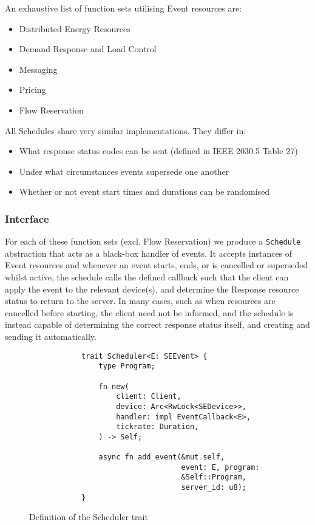 An exhaustive list of function sets utilising Event resources are:

\begin{itemize}
    \item Distributed Energy Resources
    \item Demand Response and Load Control
    \item Messaging
    \item Pricing
    \item Flow Reservation
\end{itemize}

All Schedules share very similar implementations. They differ in:

\begin{itemize}
    \item What response status codes can be sent (defined in IEEE 2030.5 Table 27)
    \item Under what circumstances events supersede one another
    \item Whether or not event start times and durations can be randomised
\end{itemize}

\subsubsection{Interface}

For each of these function sets (excl. Flow Reservation) we produce a \texttt{Schedule} abstraction that acts as a black-box handler of events. It accepts instances of Event resources and whenever an event starts, ends, or is cancelled or superseded whilst active, the schedule calls the defined callback such that the client can apply the event to the relevant device(s), and determine the Response resource status to return to the server. In many cases, such as when resources are cancelled before starting, the client need not be informed, and the schedule is instead capable of determining the correct response status itself, and creating and sending it automatically.

\begin{figure}[h]
    \begin{center}
        \begin{lstlisting}
            trait Scheduler<E: SEEvent> {
                type Program;

                fn new(
                    client: Client,
                    device: Arc<RwLock<SEDevice>>,
                    handler: impl EventCallback<E>,
                    tickrate: Duration,
                ) -> Self;

                async fn add_event(&mut self, 
                                   event: E, program:
                                   &Self::Program, 
                                   server_id: u8);
            }
        \end{lstlisting}
        \label{fig:schedulertrait}
        \vspace{-10pt}
        \caption{Definition of the Scheduler trait}
    \end{center}
\end{figure}


